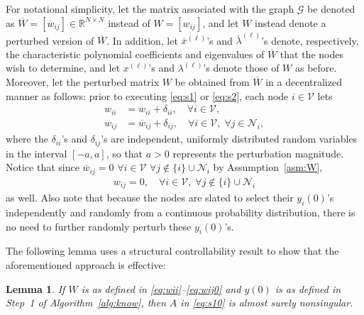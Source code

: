 \documentclass[11pt]{article}
\theoremstyle{plain}
\newtheorem{lemma}{Lemma}
\theoremstyle{definition}
\theoremstyle{remark}
\begin{document}
For notational simplicity, let the matrix associated with the graph $\mathcal{G}$ be denoted as $\overline{W}=[\overline{w}_{ij}]\in\mathbb{R}^{N\times N}$ instead of $W=[w_{ij}]$, and let $W$ instead denote a perturbed version of $\overline{W}$. In addition, let $\overline{x}^{(\ell)}$'s and $\overline{\lambda}^{(\ell)}$'s denote, respectively, the characteristic polynomial coefficients and eigenvalues of $\overline{W}$ that the nodes wish to determine, and let $x^{(\ell)}$'s and $\lambda^{(\ell)}$'s denote those of $W$ as before. Moreover, let the perturbed matrix $W$ be obtained from $\overline{W}$ in a decentralized manner as follows: prior to executing \eqref{eq:s1} or \eqref{eq:s2}, each node $i\in\mathcal{V}$ lets
\begin{align}
w_{ii}&=\overline{w}_{ii}+\delta_{ii},\quad\forall i\in\mathcal{V},\label{eq:wii}\\
w_{ij}&=\overline{w}_{ij}+\delta_{ij},\quad\forall i\in\mathcal{V},\;\forall j\in\mathcal{N}_i,\label{eq:wij}
\end{align}
where the $\delta_{ii}$'s and $\delta_{ij}$'s are independent, uniformly distributed random variables in the interval $[-a,a]$, so that $a>0$ represents the perturbation magnitude. Notice that since $\overline{w}_{ij}=0$ $\forall i\in\mathcal{V}$ $\forall j\notin\{i\}\cup\mathcal{N}_i$ by Assumption~\ref{asm:W},
\begin{align}
w_{ij}=0,\quad\forall i\in\mathcal{V},\;\forall j\notin\{i\}\cup\mathcal{N}_i\label{eq:wij0}
\end{align}
as well. Also note that because the nodes are slated to select their $y_i(0)$'s independently and randomly from a continuous probability distribution, there is no need to further randomly perturb these $y_i(0)$'s.

The following lemma uses a structural controllability result to show that the aforementioned approach is effective:

\begin{lemma}\label{lem:randpert}
If $W$ is as defined in \eqref{eq:wii}--\eqref{eq:wij0} and $y(0)$ is as defined in Step~1 of Algorithm~\ref{alg:know}, then $A$ in \eqref{eq:s10} is almost surely nonsingular.
\end{lemma}
\end{document}
